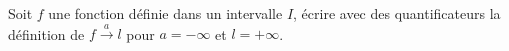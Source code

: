 Soit $f$ une fonction d\'efinie dans un intervalle $I$, \'ecrire avec des quantificateurs la d\'efinition de
$f\stackrel{a}{\rightarrow}l$ pour $a= -\infty$ et $l=+\infty$.
\bigskip
